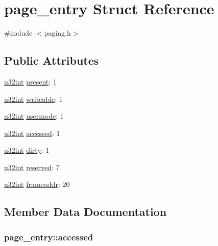 \hypertarget{structpage__entry}{}\section{page\+\_\+entry Struct Reference}
\label{structpage__entry}


{\ttfamily \#include $<$paging.\+h$>$}

\subsection*{Public Attributes}
\begin{DoxyCompactItemize}
\item 
\hyperlink{system_8h_a757de76cafbcddaac0d1632902fe4cb8}{u32int} \hyperlink{structpage__entry_a34148a94af9bfabbb8c4f00f9865dfee}{present}\+: 1
\item 
\hyperlink{system_8h_a757de76cafbcddaac0d1632902fe4cb8}{u32int} \hyperlink{structpage__entry_a2ea8d7684fe45772b6acba70d46e41d9}{writeable}\+: 1
\item 
\hyperlink{system_8h_a757de76cafbcddaac0d1632902fe4cb8}{u32int} \hyperlink{structpage__entry_a2beafd3900a1f36f09af9c35a9a14f18}{usermode}\+: 1
\item 
\hyperlink{system_8h_a757de76cafbcddaac0d1632902fe4cb8}{u32int} \hyperlink{structpage__entry_a8b4097e0cee08d028182b11bd1f73f92}{accessed}\+: 1
\item 
\hyperlink{system_8h_a757de76cafbcddaac0d1632902fe4cb8}{u32int} \hyperlink{structpage__entry_ab3b5e22c6146f227a26bdec64e63f4b0}{dirty}\+: 1
\item 
\hyperlink{system_8h_a757de76cafbcddaac0d1632902fe4cb8}{u32int} \hyperlink{structpage__entry_af6d963f09b01571b107e6f505050c0e5}{reserved}\+: 7
\item 
\hyperlink{system_8h_a757de76cafbcddaac0d1632902fe4cb8}{u32int} \hyperlink{structpage__entry_a68a6dc54a7ab6f7fb1a068476190bf67}{frameaddr}\+: 20
\end{DoxyCompactItemize}


\subsection{Member Data Documentation}
\hypertarget{structpage__entry_a8b4097e0cee08d028182b11bd1f73f92}{}
\subsubsection[{accessed}]{ page\+\_\+entry\+::accessed}\label{structpage__entry_a8b4097e0cee08d028182b11bd1f73f92}
\hypertarget{structpage__entry_ab3b5e22c6146f227a26bdec64e63f4b0}{}
